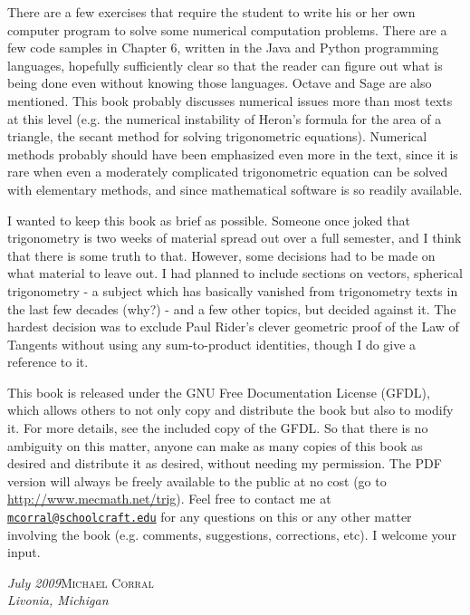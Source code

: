 There are a few exercises that require the student to write his or her own computer program
to solve some numerical computation problems. There
are a few code samples in Chapter 6, written in the Java and Python programming languages, hopefully
sufficiently clear so that the reader can figure out what is being done even without knowing those
languages. Octave and Sage are also mentioned. This book probably discusses numerical issues more
than most texts at this level (e.g. the numerical instability of Heron's formula for the area of a
triangle, the secant method for solving trigonometric equations). Numerical methods probably should
have been emphasized even more in the text, since it is rare when even a moderately complicated
trigonometric equation can be solved with elementary methods, and since mathematical software is
so readily available.

I wanted to keep this book as brief as possible. Someone once joked that trigonometry is two weeks
of material spread out over a full semester, and I think that there is some truth to that.
However, some decisions had to be made on what material to leave out. I had planned to include
sections on vectors, spherical trigonometry - a subject which has basically vanished from
trigonometry texts in the last few decades (why?) - and a few other topics, but decided against it.
The hardest decision was to exclude Paul Rider's clever geometric proof of the Law of Tangents
without using any sum-to-product identities, though I do give a reference to it.

This book is released under the GNU Free Documentation License (GFDL), which allows others to not
only copy and distribute the book but also to modify it. For more details, see the included copy of
the GFDL. So that there is no ambiguity on this matter, anyone can make as many copies of this book
as desired and distribute it as desired, without needing my permission. The PDF version will always
be freely available to the public at no cost (go to \url{http://www.mecmath.net/trig}). Feel free to
contact me at \texttt{\href{mailto:mcorral@schoolcraft.edu}{mcorral@schoolcraft.edu}} for any
questions on this or any other matter involving the book (e.g. comments, suggestions, corrections,
etc). I welcome your input.

\begin{flushleft}
\emph{July 2009}\textsc{Michael Corral}\\
\emph{Livonia, Michigan}
\end{flushleft}
